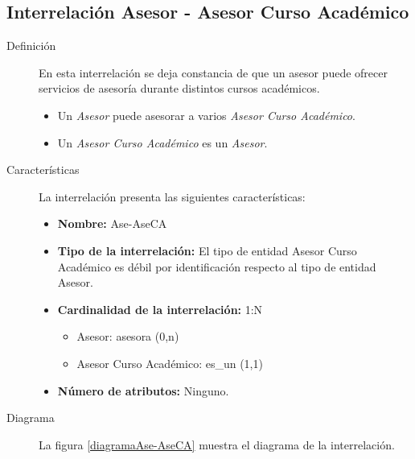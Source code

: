 \subsection{Interrelación Asesor - Asesor Curso Académico}

   \begin{description}
      \item[Definición] En esta interrelación se deja constancia de que un
      asesor puede ofrecer servicios de asesoría durante distintos cursos
      académicos.

      \begin{itemize}
       \item Un \textit{Asesor} puede asesorar a varios \textit{Asesor Curso Académico}.
       \item Un \textit{Asesor Curso Académico} es un \textit{Asesor}.
      \end{itemize}

      \item[Características] La interrelación presenta las siguientes
                             características:

         \begin{itemize}
            \item \textbf{Nombre:} Ase-AseCA
            \item \textbf{Tipo de la interrelación:} El tipo de entidad
                  Asesor Curso Académico es débil por identificación respecto al
                  tipo de entidad Asesor.
            \item \textbf{Cardinalidad de la interrelación:} 1:N
                  \begin{itemize}
                     \item Asesor: asesora (0,n)
                     \item Asesor Curso Académico: es\_un (1,1)
                  \end{itemize}
            \item \textbf{Número de atributos:} Ninguno.
         \end{itemize}

      \item[Diagrama] La figura \ref{diagramaAse-AseCA} muestra el diagrama de la
                      interrelación.


\end{description}
